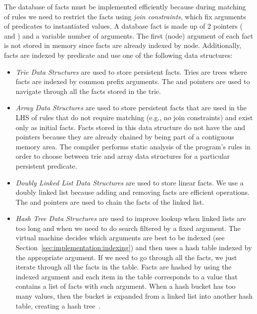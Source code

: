 The database of facts must be implemented efficiently because during matching of
rules we need to restrict the facts using \emph{join constraints}, which fix
arguments of predicates to instantiated values. A database fact is made up of 2
pointers ( and ) and a variable number of arguments. The
first (node) argument of each fact is not stored in memory since facts are
already indexed by node. Additionally, facts are indexed by predicate and use
one of the following data structures:

\begin{itemize}

\item \emph{Trie Data Structures} are used to store persistent facts. Tries are
   trees where facts are indexed by common prefix arguments. The  and
    pointers are used to navigate through all the facts stored in the
   trie.

\item \emph{Array Data Structures} are used to store persistent facts that are
   used in the LHS of rules that do not require matching (e.g., no join
   constraints) and exist only as initial facts. Facts stored in this data
   structure do not have the  and  pointers because they
   are already chained by being part of a contiguous memory area. The compiler
   performs static analysis of the program's rules in order to choose between
   trie and array data structures for a particular persistent predicate.

\item \emph{Doubly Linked List Data Structures} are used to store linear facts.
   We use a doubly linked list because adding and removing facts are efficient
   operations.  The  and  pointers are used to chain the
   facts of the linked list.

\item \emph{Hash Tree Data Structures} are used to improve lookup when linked
   lists are too long and when we need to do search filtered by a fixed
   argument. The virtual machine decides which arguments are best to be indexed
   (see Section~\ref{sec:implementation:indexing}) and then uses a hash table
   indexed by the appropriate argument. If we need to go through all the facts,
   we just iterate through all the facts in the table. Facts are hashed by using
   the indexed argument and each item in the table corresponds to a value that
   contains a list of facts with such argument. When a hash bucket has too
   many values, then the bucket is expanded from a linked list into another hash
   table, creating a hash tree~\cite{Bagwell01idealhash}.

\end{itemize}

